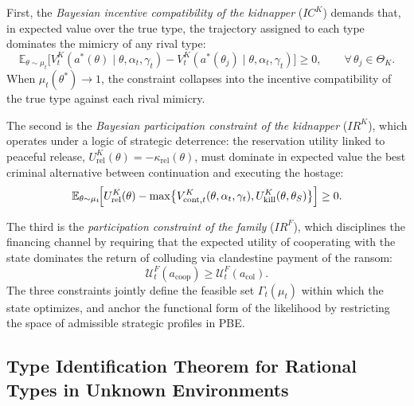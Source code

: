 \documentclass[review,authoryear,12pt]{elsarticle}
\theoremstyle{plain}
\theoremstyle{definition}
\newcommand{\E}{\mathbb{E}}
\newcommand{\ThetaK}{\Theta_K}
\newcommand{\1}{\mathbf{1}}
\begin{document}
First, the \emph{Bayesian incentive compatibility of the kidnapper} ($IC^K$) demands that, in expected value over the true type, the trajectory assigned to each type dominates the mimicry of any rival type:
\begin{equation}
\E_{\theta\sim\mu_t}\!\bigl[V^K_t(a^\ast(\theta)\mid\theta,\alpha_t,\gamma_t)-V^K_t(a^\ast(\theta_j)\mid\theta,\alpha_t,\gamma_t)\bigr]\ge 0,\qquad\forall\,\theta_j\in\ThetaK.
\label{eq:ic-kidnapper}
\end{equation}
When $\mu_t(\theta^\ast)\to 1$, the constraint collapses into the incentive compatibility of the true type against each rival mimicry.

The second is the \emph{Bayesian participation constraint of the kidnapper} ($IR^K$), which operates under a logic of strategic deterrence: the reservation utility linked to peaceful release, $U^K_{\mathrm{rel}}(\theta)=-\kappa_{\mathrm{rel}}(\theta)$, must dominate in expected value the best criminal alternative between continuation and executing the hostage:
\begin{equation}
\E_{\theta\sim\mu_t}\!\Bigl[U^K_{\mathrm{rel}}(\theta)-\max\bigl\{V^K_{\mathrm{cont},t}(\theta,\alpha_t,\gamma_t),U^K_{\mathrm{kill}}(\theta,\theta_S)\bigr\}\Bigr]\ge 0.
\label{eq:ir-K}
\end{equation}

The third is the \emph{participation constraint of the family} ($IR^F$), which disciplines the financing channel by requiring that the expected utility of cooperating with the state dominates the return of colluding via clandestine payment of the ransom:
\begin{equation}
\mathcal{U}^F_t(a_{\mathrm{coop}})\ge\mathcal{U}^F_t(a_{\mathrm{col}}).
\label{eq:ir-family}
\end{equation}
The three constraints jointly define the feasible set $\Gamma_t(\mu_t)$ within which the state optimizes, and anchor the functional form of the likelihood by restricting the space of admissible strategic profiles in PBE.

\subsection{Type Identification Theorem for Rational Types in Unknown Environments}\label{subsec:formal-defs}
\end{document}
